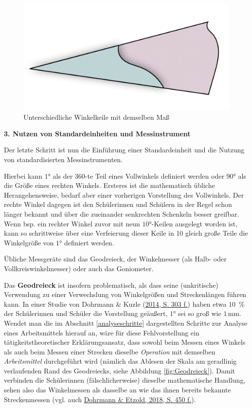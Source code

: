 \documentclass[
]{scrbook}
\theoremstyle{definition}
\theoremstyle{definition}
\theoremstyle{definition}
\theoremstyle{definition}
\theoremstyle{remark}
\begin{document}
\begin{figure}

{\centering \includegraphics[width=0.5\linewidth]{pictures/11-Winkelkeile} 

}

\caption{Unterschiedliche Winkelkeile mit demselben Maß}\label{fig:Winkelkeile}
\end{figure}

\textbf{3. Nutzen von Standardeinheiten und Messinstrument}

Der letzte Schritt ist nun die Einführung einer Standardeinheit und die Nutzung von standardisierten Messinstrumenten.

Hierbei kann \(1°\) als der 360-te Teil eines Vollwinkels definiert werden oder \(90°\) als die Größe eines rechten Winkels. Ersteres ist die mathematisch übliche Herangehensweise, bedarf aber einer vorherigen Vorstellung des Vollwinkels. Der rechte Winkel dagegen ist den Schülerinnen und Schülern in der Regel schon länger bekannt und über die zueinander senkrechten Schenkeln besser greifbar. Wenn bsp. ein rechter Winkel zuvor mit neun \(10°\)-Keilen ausgelegt worden ist, kann so schrittweise über eine Verfeierung dieser Keile in 10 gleich große Teile die Winkelgröße von \(1°\) definiert werden.

Übliche Messgeräte sind das Geodreieck, der Winkelmesser (als Halb- oder Vollkreiswinkelmesser) oder auch das Goniometer.

Das \textbf{Geodreieck} ist insofern problematisch, als dass seine (unkritische) Verwendung zu einer Verwechslung von Winkelgrößen und Streckenlängen führen kann. In einer Studie von Dohrmann \& Kuzle (\protect\hyperlink{ref-Dohrmann2014}{2014, S. 303 f.}) haben etwa 10~\% der Schülerinnen und Schüler die Vorstellung geäußert, \(1°\) sei so groß wie \(1\,\mathrm{mm}\). Wendet man die im Abschnitt \ref{analyseschritte} dargestellten Schritte zur Analyse eines Arbeitsmittels hierauf an, wäre für diese Fehlvorstellung ein tätigkeitstheoretischer Erklärungsansatz, dass sowohl beim Messen eines Winkels als auch beim Messen einer Strecken dieselbe \emph{Operation} mit demselben \emph{Arbeitsmittel} durchgeführt wird (nämlich das Ablesen der Skala am geradlinig verlaufenden Rand des Geodreiecks, siehe Abbildung \ref{fig:Geodreieck}). Damit verbinden die Schülerinnen (fälschlicherweise) dieselbe mathematische Handlung, sehen also das Winkelmessen als dasselbe an wie das ihnen bereits bekannte Streckenmessen (vgl. auch \protect\hyperlink{ref-Dohrmann2018b}{Dohrmann \& Etzold, 2018, S. 450 f.}).
\end{document}

